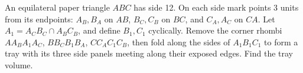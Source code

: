 An equilateral paper triangle $ABC$ has side 12. On each side mark points 3 units from its endpoints: $A_B,B_A$ on $AB$, $B_C,C_B$ on $BC$, and $C_A,A_C$ on $CA$. Let $A_1=A_CB_C\cap A_BC_B$, and define $B_1,C_1$ cyclically. Remove the corner rhombi $AA_BA_1A_C$, $BB_CB_1B_A$, $CC_AC_1C_B$, then fold along the sides of $A_1B_1C_1$ to form a tray with its three side panels meeting along their exposed edges. Find the tray volume.
